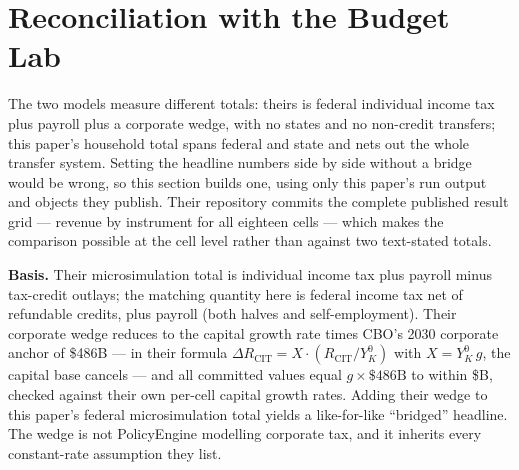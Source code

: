 \section{Reconciliation with the Budget Lab}\label{sec:reconciliation}

The two models measure different totals: theirs is federal individual income
tax plus payroll plus a corporate wedge, with no states and no non-credit
transfers; this paper's household total spans federal and state and nets out
the whole transfer system. Setting the headline numbers side by side without
a bridge would be wrong, so this section builds one, using only this paper's
run output and objects they publish. Their repository commits the complete
published result grid --- revenue by instrument for all eighteen cells ---
which makes the comparison possible at the cell level rather than against
two text-stated totals.

\textbf{Basis.} Their microsimulation total is individual income tax plus
payroll minus tax-credit outlays; the matching quantity here is federal
income tax net of refundable credits, plus payroll (both halves and
self-employment). Their corporate wedge reduces to the capital growth rate
times CBO's 2030 corporate anchor of \$486B --- in their formula
$\Delta R_{\mathrm{CIT}} = X \cdot (R_{\mathrm{CIT}}/Y^0_K)$ with
$X = Y^0_K\,g$, the capital base cancels --- and all \genTheirNCells{}
committed values equal $g \times \$486\mathrm{B}$ to within
\$\genCitWedgeMaxDevB B, checked against their own per-cell capital growth
rates. Adding their wedge
to this paper's federal microsimulation total yields a like-for-like
``bridged'' headline. The wedge is not PolicyEngine modelling corporate tax,
and it inherits every constant-rate assumption they list.

\begin{table}[t]
\centering
\tabBridge
\caption{The bridged headline cell (Rapid~/~expansive, their central
published scenario), \$B, 2030. ``IIT (net)'' is individual income tax net
of refundable credits; the corporate wedge is theirs in both rows.}
\label{tab:bridge}
\end{table}

